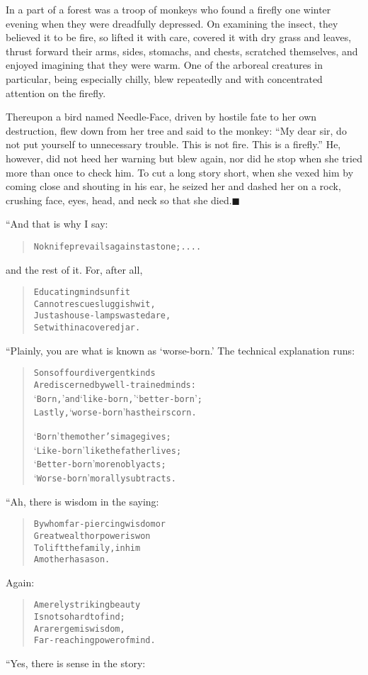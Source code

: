 \documentclass[article, twoside, 14pt]{memoir}
\newcommand{\qed}{\hfill \ensuremath{\blacksquare}}
\renewenvironment{verbatim}{%
\begin{quote}%
\vskip -10pt%
\begin{alltt}\normalfont\large}{\end{alltt}%
\end{quote}%
\vskip -10pt
} %
\begin{document}
\label{s28}

In a part of a forest was a troop of monkeys who found a firefly
one winter evening when they were dreadfully depressed. On
examining the insect, they believed it to be fire, so lifted it
with care, covered it with dry grass and leaves, thrust forward
their arms, sides, stomachs, and chests, scratched themselves, and
enjoyed imagining that they were warm. One of the arboreal
creatures in particular, being especially chilly, blew repeatedly
and with concentrated attention on the firefly.

Thereupon a bird named Needle-Face, driven by hostile fate to her
own destruction, flew down from her tree and said to the monkey:
``My dear sir, do not put yourself to unnecessary trouble. This is not fire. This is a firefly.''
He, however, did not heed her warning but blew again, nor did he
stop when she tried more than once to check him. To cut a long
story short, when she vexed him by coming close and shouting in his
ear, he seized her and dashed her on a rock, crushing face, eyes,
head, and neck so that she died.\hyperref[s28]{\qed}

“And that is why I say:

\begin{verbatim}
No knife prevails against a stone; ....
\end{verbatim}
and the rest of it. For, after all,

\begin{verbatim}
Educating minds unfit
Cannot rescue sluggish wit,
Just as house-lamps wasted are,
Set within a covered jar.
\end{verbatim}
“Plainly, you are what is known as `worse-born.' The technical
explanation runs:

\begin{verbatim}
Sons of four divergent kinds
Are discerned by well-trained minds:
‘Born,’ and ‘like-born,’ ‘better-born’;
Lastly, ‘worse-born’ has their scorn.

‘Born’ the mother's image gives;
‘Like-born’ like the father lives;
‘Better-born’ more nobly acts;
‘Worse-born’ morally subtracts.
\end{verbatim}
“Ah, there is wisdom in the saying:

\begin{verbatim}
By whom far-piercing wisdom or
    Great wealth or power is won
To lift the family, in him
    A mother has a son.
\end{verbatim}
Again:

\begin{verbatim}
A merely striking beauty
    Is not so hard to find;
A rarer gem is wisdom,
    Far-reaching power of mind.
\end{verbatim}
“Yes, there is sense in the story:
\end{document}
